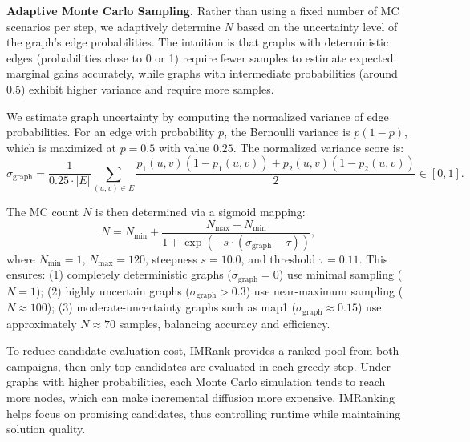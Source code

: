 \documentclass[onecolumn,a4paper,12pt]{IEEEtran}
\begin{document}
\textbf{Adaptive Monte Carlo Sampling.} Rather than using a fixed number of MC scenarios per step, we adaptively determine $N$ based on the uncertainty level of the graph's edge probabilities. The intuition is that graphs with deterministic edges (probabilities close to 0 or 1) require fewer samples to estimate expected marginal gains accurately, while graphs with intermediate probabilities (around 0.5) exhibit higher variance and require more samples.

We estimate graph uncertainty by computing the normalized variance of edge probabilities. For an edge with probability $p$, the Bernoulli variance is $p(1-p)$, which is maximized at $p=0.5$ with value $0.25$. The normalized variance score is:
\begin{equation}
\sigma_{\text{graph}} = \frac{1}{0.25 \cdot |E|} \sum_{(u,v)\in E} \frac{p_1(u,v)(1-p_1(u,v)) + p_2(u,v)(1-p_2(u,v))}{2} \in [0,1].
\end{equation}

The MC count $N$ is then determined via a sigmoid mapping:
\begin{equation}
N = N_{\min} + \frac{N_{\max} - N_{\min}}{1 + \exp\left(-s \cdot (\sigma_{\text{graph}} - \tau)\right)},
\end{equation}
where $N_{\min}=1$, $N_{\max}=120$, steepness $s=10.0$, and threshold $\tau=0.11$. This ensures: (1) completely deterministic graphs ($\sigma_{\text{graph}}=0$) use minimal sampling ($N=1$); (2) highly uncertain graphs ($\sigma_{\text{graph}} > 0.3$) use near-maximum sampling ($N \approx 100$); (3) moderate-uncertainty graphs such as map1 ($\sigma_{\text{graph}} \approx 0.15$) use approximately $N \approx 70$ samples, balancing accuracy and efficiency.

To reduce candidate evaluation cost, IMRank \cite{cheng2014imrankinfluencemaximizationfinding} provides a ranked pool from both campaigns, then only top candidates are evaluated in each greedy step. Under graphs with higher probabilities, each Monte Carlo simulation tends to reach more nodes, which can make incremental diffusion more expensive. IMRanking helps focus on promising candidates, thus controlling runtime while maintaining solution quality.
\end{document}
